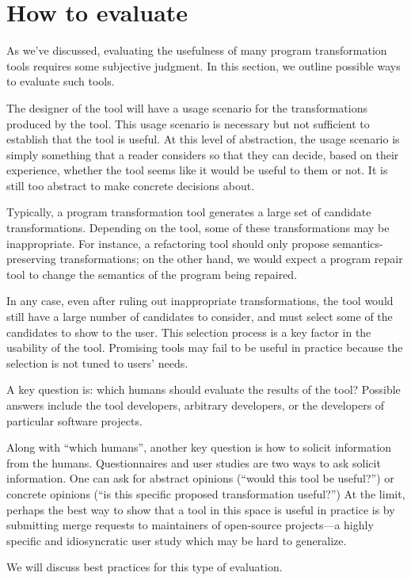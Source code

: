 \section{How to evaluate}
As we've discussed, evaluating the usefulness of many program
transformation tools requires some subjective judgment. In this
section, we outline possible ways to evaluate such tools.

The designer of the tool will have a usage scenario for the 
transformations produced by the tool. This usage scenario is 
necessary but not sufficient to establish that the tool is useful.
At this level of abstraction, the usage scenario is simply something
that a reader considers so that they can decide, based on their experience, 
whether the tool seems like it would be useful to them or not. 
It is still too abstract to make concrete decisions about.

Typically, a program transformation tool generates a large set of
candidate transformations. Depending on the tool, some of these
transformations may be inappropriate. For instance, a refactoring
tool should only propose semantics-preserving transformations; on the
other hand, we would expect a program repair tool to change the semantics
of the program being repaired. 

In any case, even after ruling out 
inappropriate transformations, the tool would still have a large
number of candidates to consider, and must select some of the candidates to show
to the user. This selection process is a key factor in the usability of the tool.
Promising tools may fail to be useful in practice because the selection is not
tuned to users' needs.

A key question is: which humans should evaluate the results of the tool?
Possible answers include the tool developers, arbitrary developers, or the developers
of particular software projects.

Along with ``which humans'', another key question is how to solicit
information from the humans. Questionnaires and user studies are two
ways to ask solicit information. One can ask for abstract opinions
(``would this tool be useful?'') or concrete opinions (``is this
specific proposed transformation useful?'') At the limit, perhaps the
best way to show that a tool in this space is useful in practice is by
submitting merge requests to maintainers of open-source projects---a 
highly specific and idiosyncratic user study which may be hard to generalize.

We will discuss best practices for this type of evaluation.
